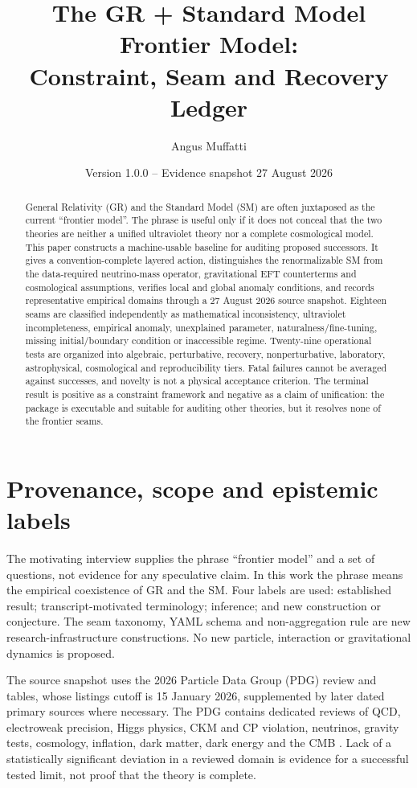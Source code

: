 \documentclass[11pt,a4paper]{article}
\title{The GR + Standard Model Frontier Model:\\Constraint, Seam and Recovery Ledger}
\author{Angus Muffatti}
\date{Version 1.0.0 -- Evidence snapshot 27 August 2026}
\begin{document}
\sloppy
\maketitle

\begin{abstract}
General Relativity (GR) and the Standard Model (SM) are often juxtaposed as the current ``frontier model''.  The phrase is useful only if it does not conceal that the two theories are neither a unified ultraviolet theory nor a complete cosmological model.  This paper constructs a machine-usable baseline for auditing proposed successors.  It gives a convention-complete layered action, distinguishes the renormalizable SM from the data-required neutrino-mass operator, gravitational EFT counterterms and cosmological assumptions, verifies local and global anomaly conditions, and records representative empirical domains through a 27 August 2026 source snapshot.  Eighteen seams are classified independently as mathematical inconsistency, ultraviolet incompleteness, empirical anomaly, unexplained parameter, naturalness/fine-tuning, missing initial/boundary condition or inaccessible regime.  Twenty-nine operational tests are organized into algebraic, perturbative, recovery, nonperturbative, laboratory, astrophysical, cosmological and reproducibility tiers.  Fatal failures cannot be averaged against successes, and novelty is not a physical acceptance criterion.  The terminal result is positive as a constraint framework and negative as a claim of unification: the package is executable and suitable for auditing other theories, but it resolves none of the frontier seams.
\end{abstract}

\tableofcontents

\section{Provenance, scope and epistemic labels}
The motivating interview supplies the phrase ``frontier model'' and a set of questions, not evidence for any speculative claim.  In this work the phrase means the empirical coexistence of GR and the SM.  Four labels are used: established result; transcript-motivated terminology; inference; and new construction or conjecture.  The seam taxonomy, YAML schema and non-aggregation rule are new research-infrastructure constructions.  No new particle, interaction or gravitational dynamics is proposed.

The source snapshot uses the 2026 Particle Data Group (PDG) review and tables, whose listings cutoff is 15 January 2026, supplemented by later dated primary sources where necessary.  The PDG contains dedicated reviews of QCD, electroweak precision, Higgs physics, CKM and CP violation, neutrinos, gravity tests, cosmology, inflation, dark matter, dark energy and the CMB \cite{PDG2026}.  Lack of a statistically significant deviation in a reviewed domain is evidence for a successful tested limit, not proof that the theory is complete.
\end{document}
